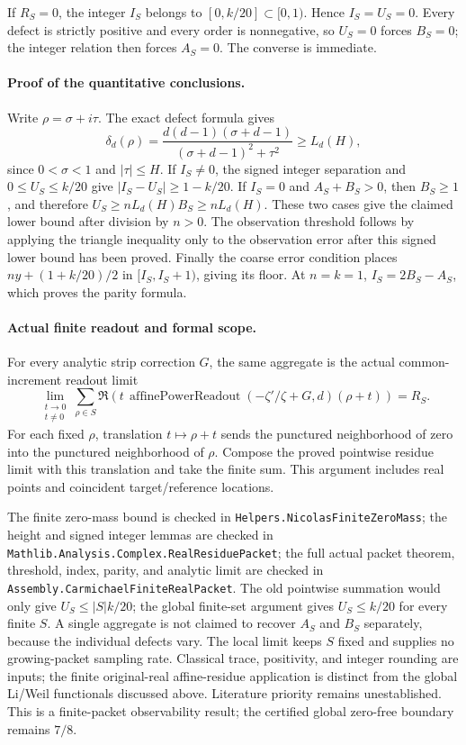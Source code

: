 If \(R_S=0\), the integer \(I_S\) belongs to \([0,k/20]\subset[0,1)\).
Hence \(I_S=U_S=0\). Every defect is strictly positive and every order
is nonnegative, so \(U_S=0\) forces \(B_S=0\); the integer relation then
forces \(A_S=0\). The converse is immediate.

\paragraph{Proof of the quantitative conclusions.}
Write \(\rho=\sigma+i\tau\). The exact defect formula gives
\[
 \delta_d(\rho)=
 \frac{d(d-1)(\sigma+d-1)}
      {(\sigma+d-1)^2+\tau^2}\ge L_d(H),
\]
since \(0<\sigma<1\) and \(|\tau|\le H\).
If \(I_S\ne0\), the signed integer separation and \(0\le U_S\le k/20\)
give \(|I_S-U_S|\ge1-k/20\). If \(I_S=0\) and \(A_S+B_S>0\),
then \(B_S\ge1\), and therefore
\(U_S\ge nL_d(H)B_S\ge nL_d(H)\).
These two cases give the claimed lower bound after division by \(n>0\).
The observation threshold follows by applying the triangle inequality
only to the observation error after this signed lower bound has been proved.
Finally the coarse error condition places
\(ny+(1+k/20)/2\) in \([I_S,I_S+1)\), giving its floor.
At \(n=k=1\), \(I_S=2B_S-A_S\), which proves the parity formula.

\paragraph{Actual finite readout and formal scope.}
For every analytic strip correction \(G\), the same aggregate is the
actual common-increment readout limit
\[
 \lim_{\substack{t\to0\\t\ne0}}
 \sum_{\rho\in S}\Re\!\left(
 t\,\operatorname{affinePowerReadout}(-\zeta'/\zeta+G,d)(\rho+t)
 \right)=R_S.
\]
For each fixed \(\rho\), translation \(t\mapsto\rho+t\) sends the punctured
neighborhood of zero into the punctured neighborhood of \(\rho\).
Compose the proved pointwise residue limit with this translation and
take the finite sum. This argument includes real points and coincident
target/reference locations.

The finite zero-mass bound is checked in
\texttt{Helpers.NicolasFiniteZeroMass}; the height and signed integer
lemmas are checked in \texttt{Mathlib.Analysis.Complex.RealResiduePacket};
the full actual packet theorem, threshold, index, parity, and analytic
limit are checked in \texttt{Assembly.CarmichaelFiniteRealPacket}.
The old pointwise summation would only give \(U_S\le |S|k/20\);
the global finite-set argument gives \(U_S\le k/20\) for every finite \(S\).
A single aggregate is not claimed to recover \(A_S\) and \(B_S\)
separately, because the individual defects vary. The local limit keeps
\(S\) fixed and supplies no growing-packet sampling rate. Classical
trace, positivity, and integer rounding are inputs; the finite original-real
affine-residue application is distinct from the global Li/Weil functionals
discussed above. Literature priority remains unestablished.
This is a finite-packet observability result; the certified global
zero-free boundary remains \(7/8\).

